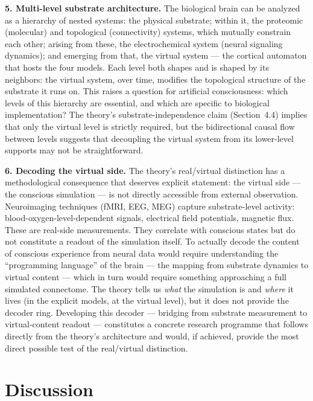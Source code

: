\documentclass[12pt]{article}
\begin{document}
\textbf{5. Multi-level substrate architecture.} The biological brain can be analyzed as a hierarchy of nested systems: the physical substrate; within it, the proteomic (molecular) and topological (connectivity) systems, which mutually constrain each other; arising from these, the electrochemical system (neural signaling dynamics); and emerging from that, the virtual system --- the cortical automaton that hosts the four models. Each level both shapes and is shaped by its neighbors: the virtual system, over time, modifies the topological structure of the substrate it runs on. This raises a question for artificial consciousness: which levels of this hierarchy are essential, and which are specific to biological implementation? The theory's substrate-independence claim (Section~4.4) implies that only the virtual level is strictly required, but the bidirectional causal flow between levels suggests that decoupling the virtual system from its lower-level supports may not be straightforward.

\textbf{6. Decoding the virtual side.} The theory's real/virtual distinction has a methodological consequence that deserves explicit statement: the virtual side --- the conscious simulation --- is not directly accessible from external observation. Neuroimaging techniques (fMRI, EEG, MEG) capture substrate-level activity: blood-oxygen-level-dependent signals, electrical field potentials, magnetic flux. These are real-side measurements. They correlate with conscious states but do not constitute a readout of the simulation itself. To actually decode the content of conscious experience from neural data would require understanding the ``programming language'' of the brain --- the mapping from substrate dynamics to virtual content --- which in turn would require something approaching a full simulated connectome. The theory tells us \emph{what} the simulation is and \emph{where} it lives (in the explicit models, at the virtual level), but it does not provide the decoder ring. Developing this decoder --- bridging from substrate measurement to virtual-content readout --- constitutes a concrete research programme that follows directly from the theory's architecture and would, if achieved, provide the most direct possible test of the real/virtual distinction.




\section{Discussion}
\end{document}
